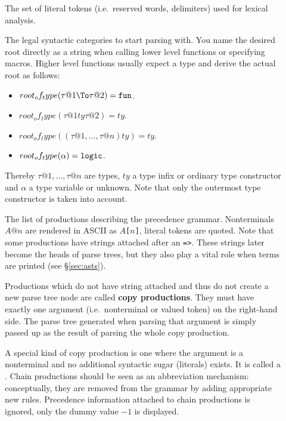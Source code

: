 \begin{description}
  \item[]
    The set of literal tokens (i.e.\ reserved words, delimiters) used for
    lexical analysis.

  \item[]
    The legal syntactic categories to start parsing with. You name the
    desired root directly as a string when calling lower level functions or
    specifying macros. Higher level functions usually expect a type and
    derive the actual root as follows:
    \begin{itemize}
      \item $root_of_type(\tau@1 \To \tau@2) = \mtt{fun}$.

      \item $root_of_type(\tau@1 \mathrel{ty} \tau@2) = ty$.

      \item $root_of_type((\tau@1, \dots, \tau@n)ty) = ty$.

      \item $root_of_type(\alpha) = \mbox{\tt logic}$.
    \end{itemize}
    Thereby $\tau@1, \dots, \tau@n$ are types, $ty$ a type infix or ordinary
    type constructor and $\alpha$ a type variable or unknown. Note that only
    the outermost type constructor is taken into account.

  \item[]
    The list of productions describing the precedence grammar. Nonterminals
    $A@n$ are rendered in ASCII as {\tt $A$[$n$]}, literal tokens are quoted.
    Note that some productions have strings attached after an {\tt =>}. These
    strings later become the heads of parse trees, but they also play a vital
    role when terms are printed (see \S\ref{sec:asts}).

    Productions which do not have string attached and thus do not create a
    new parse tree node are called {\bf copy productions}. They must have exactly one
    argument (i.e.\ nonterminal or valued token)
    on the right-hand side. The parse tree generated when parsing that
    argument is simply passed up as the result of parsing the whole copy
    production.

    A special kind of copy production is one where the argument is a
    nonterminal and no additional syntactic sugar (literals) exists. It is
    called a . Chain productions should be seen as
    an abbreviation mechanism: conceptually, they are removed from the
    grammar by adding appropriate new rules. Precedence information attached
    to chain productions is ignored, only the dummy value $-1$ is displayed.


\end{description}
